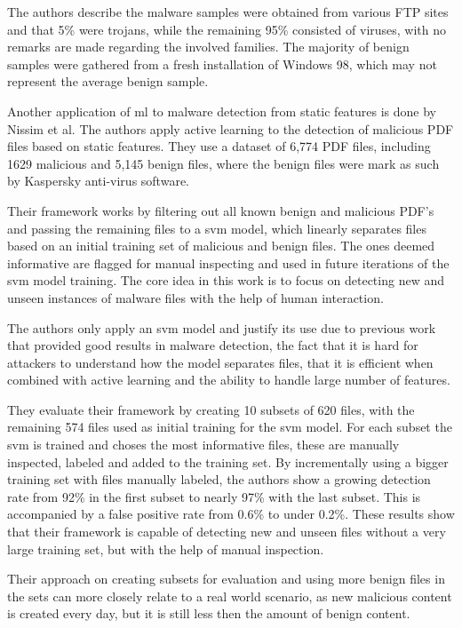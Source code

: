 \documentclass{llncs}
\begin{document}
The authors describe the malware samples were obtained from various FTP sites and that 5\% were trojans, while the remaining 95\% consisted of viruses, with no remarks are made regarding the involved families. The majority of benign samples were gathered from a fresh installation of Windows 98, which may not represent the average benign sample.

Another application of \gls{ml} to malware detection from static features is done by Nissim et al\cite{nissim:al_pdf}. The authors apply active learning to the detection of malicious PDF files based on static features. They use a dataset of 6,774 PDF files, including 1629 malicious and 5,145 benign files, where the benign files were mark as such by Kaspersky anti-virus software.

Their framework works by filtering out all known benign and malicious PDF's and passing the remaining files to a \gls{svm} model, which linearly separates files based on an initial training set of malicious and benign files. The ones deemed informative are flagged for manual inspecting and used in future iterations of the \gls{svm} model training. The core idea in this work is to focus on detecting new and unseen instances of malware files with the help of human interaction.

The authors only apply an \gls{svm} model and justify its use due to previous work that provided good results in malware detection, the fact that it is hard for attackers to understand how the model separates files, that it is efficient when combined with active learning and the ability to handle large number of features.

They evaluate their framework by creating 10 subsets of 620 files, with the remaining 574 files used as initial training for the \gls{svm} model. For each subset the \gls{svm} is trained and choses the most informative files, these are manually inspected, labeled and added to the training set. By incrementally using a bigger training set with files manually labeled, the authors show a growing detection rate from 92\% in the first subset to nearly 97\% with the last subset. This is accompanied by a false positive rate from 0.6\% to under 0.2\%. These results show that their framework is capable of detecting new and unseen files without a very large training set, but with the help of manual inspection.

Their approach on creating subsets for evaluation and using more benign files in the sets can more closely relate to a real world scenario, as new malicious content is created every day, but it is still less then the amount of benign content.
\end{document}
